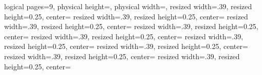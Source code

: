 \pgfpagesphysicalpageoptions%
{
logical pages=9,
physical height=\paperheight,
physical width=\paperwidth,
}
{
resized width=.39\pgfphysicalheight,
resized height=0.25\pgfphysicalwidth,
center=\pgfpoint{0.23\pgfphysicalheight}{0.63\pgfphysicalwidth}
}
{
resized width=.39\pgfphysicalheight,
resized height=0.25\pgfphysicalwidth,
center=\pgfpoint{.64\pgfphysicalheight}{.63\pgfphysicalwidth}
}
{
resized width=.39\pgfphysicalheight,
resized height=0.25\pgfphysicalwidth,
center=\pgfpoint{1.05\pgfphysicalheight}{.63\pgfphysicalwidth}
}
{
resized width=.39\pgfphysicalheight,
resized height=0.25\pgfphysicalwidth,
center=\pgfpoint{.23\pgfphysicalheight}{.395\pgfphysicalwidth}
}
{
resized width=.39\pgfphysicalheight,
resized height=0.25\pgfphysicalwidth,
center=\pgfpoint{.64\pgfphysicalheight}{.395\pgfphysicalwidth}
}
{
resized width=.39\pgfphysicalheight,
resized height=0.25\pgfphysicalwidth,
center=\pgfpoint{1.05\pgfphysicalheight}{.395\pgfphysicalwidth}
}
{
resized width=.39\pgfphysicalheight,
resized height=0.25\pgfphysicalwidth,
center=\pgfpoint{.23\pgfphysicalheight}{.16\pgfphysicalwidth}
}
{
resized width=.39\pgfphysicalheight,
resized height=0.25\pgfphysicalwidth,
center=\pgfpoint{.64\pgfphysicalheight}{.16\pgfphysicalwidth}
}
{
resized width=.39\pgfphysicalheight,
resized height=0.25\pgfphysicalwidth,
center=\pgfpoint{1.05\pgfphysicalheight}{.16\pgfphysicalwidth}
}

